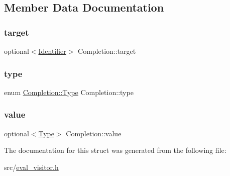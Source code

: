 \subsection{Member Data Documentation}
\mbox{\label{struct_completion_a6c68d7405ba6a7b2d508f936cbf0be5c}} 
\subsubsection{\texorpdfstring{target}{target}}
{\footnotesize\ttfamily optional$<$\hyperlink{struct_identifier}{Identifier}$>$ Completion\+::target}

\mbox{\label{struct_completion_a89320790d1fa2706f4bb85ad30673a9f}} 
\subsubsection{\texorpdfstring{type}{type}}
{\footnotesize\ttfamily enum \hyperlink{struct_completion_af7c4c541b6dc1c492a4e140f04fd66d9}{Completion\+::\+Type}  Completion\+::type}

\mbox{\label{struct_completion_a9cd2ab31c45bfa5a9acde9d033debbe1}} 
\subsubsection{\texorpdfstring{value}{value}}
{\footnotesize\ttfamily optional$<$\hyperlink{struct_completion_af7c4c541b6dc1c492a4e140f04fd66d9}{Type}$>$ Completion\+::value}



The documentation for this struct was generated from the following file\+:\begin{DoxyCompactItemize}
\item 
src/\hyperlink{eval__visitor_8h}{eval\+\_\+visitor.\+h}\end{DoxyCompactItemize}
